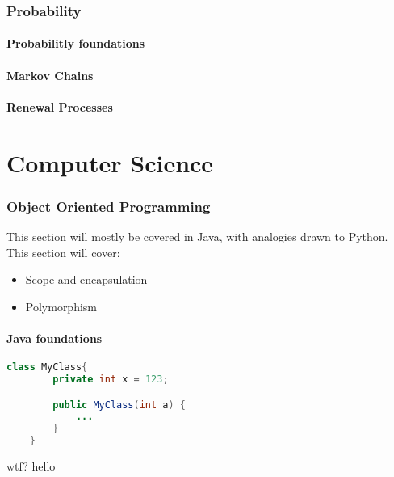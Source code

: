 \documentclass[10pt,a4paper,fleqn]{article} %
\begin{document}
\section{Probability} %

\subsection{Probabilitly foundations} %

\subsection{Markov Chains} %

\subsection{Renewal Processes} %

\newpage

\part{Computer Science}

\section{Object Oriented Programming} %
This section will mostly be covered in Java, with analogies drawn to Python. 
This section will cover:
\begin{itemize}
    \item Scope and encapsulation
    \item Polymorphism
\end{itemize}

\subsection{Java foundations} %

\begin{lstlisting}[language=Java,style=javac]
    class MyClass{
        private int x = 123;

        public MyClass(int a) {
            ...
        }
    }
\end{lstlisting}
wtf?
hello
\end{document}
